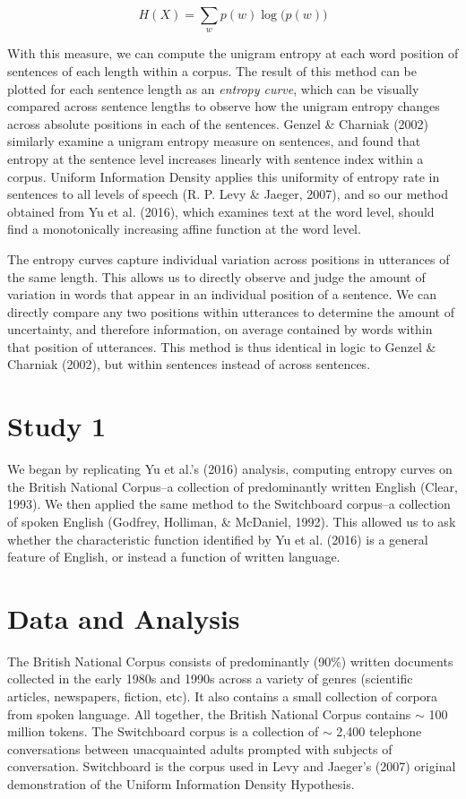 \documentclass[10pt, letterpaper]{article}
\begin{document}
\[H(X) = \sum\limits_w p(w)\log\big(p(w)\big)\]

With this measure, we can compute the unigram entropy at each word
position of sentences of each length within a corpus. The result of this
method can be plotted for each sentence length as an \emph{entropy
curve}, which can be visually compared across sentence lengths to
observe how the unigram entropy changes across absolute positions in
each of the sentences. Genzel \& Charniak (2002) similarly examine a
unigram entropy measure on sentences, and found that entropy at the
sentence level increases linearly with sentence index within a corpus.
Uniform Information Density applies this uniformity of entropy rate in
sentences to all levels of speech (R. P. Levy \& Jaeger, 2007), and so
our method obtained from Yu et al. (2016), which examines text at the
word level, should find a monotonically increasing affine function at
the word level.

The entropy curves capture individual variation across positions in
utterances of the same length. This allows us to directly observe and
judge the amount of variation in words that appear in an individual
position of a sentence. We can directly compare any two positions within
utterances to determine the amount of uncertainty, and therefore
information, on average contained by words within that position of
utterances. This method is thus identical in logic to Genzel \& Charniak
(2002), but within sentences instead of across sentences.

\section{Study 1}\label{study-1}

We began by replicating Yu et al.'s (2016) analysis, computing entropy
curves on the British National Corpus--a collection of predominantly
written English (Clear, 1993). We then applied the same method to the
Switchboard corpus--a collection of spoken English (Godfrey, Holliman,
\& McDaniel, 1992). This allowed us to ask whether the characteristic
function identified by Yu et al. (2016) is a general feature of English,
or instead a function of written language.

\section{Data and Analysis}\label{data-and-analysis}

The British National Corpus consists of predominantly (90\%) written
documents collected in the early 1980s and 1990s across a variety of
genres (scientific articles, newspapers, fiction, etc). It also contains
a small collection of corpora from spoken language. All together, the
British National Corpus contains \(\sim\) 100 million tokens. The
Switchboard corpus is a collection of \(\sim\) 2,400 telephone
conversations between unacquainted adults prompted with subjects of
conversation. Switchboard is the corpus used in Levy and Jaeger's (2007)
original demonstration of the Uniform Information Density Hypothesis.
\end{document}
